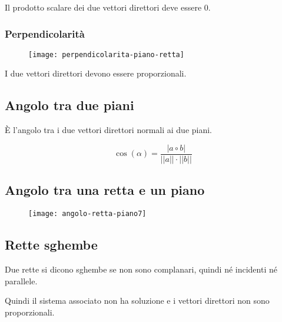 Il prodotto scalare dei due vettori direttori deve essere 0.

\subsubsection{Perpendicolarità}

\begin{figure}[H]
\texttt{[image: perpendicolarita-piano-retta]}
\centering
\end{figure}

I due vettori direttori devono essere proporzionali.


\subsection{Angolo tra due piani}

È l'angolo tra i due vettori direttori normali ai due piani.

$$\cos(\alpha) = \frac{|a \circ b|}{||a|| \cdot ||b||}$$

\subsection{Angolo tra una retta e un piano}

\begin{figure}[H]
\texttt{[image: angolo-retta-piano7]}
\centering
\end{figure}

\subsection{Rette sghembe}
Due rette si dicono sghembe se non sono complanari, quindi né incidenti né parallele.

Quindi il sistema associato non ha soluzione e i vettori direttori non sono proporzionali.
